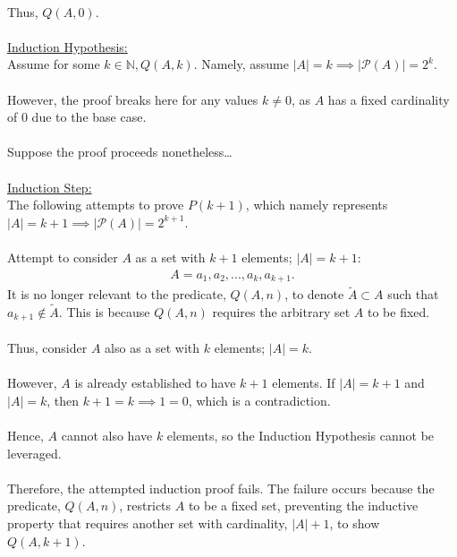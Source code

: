 \documentclass[12pt]{article}
\begin{document}
\\
Thus, $Q(A, 0)$. \\
\\
\underline{Induction Hypothesis:} \\
Assume for some $k \in \mathbb{N}, Q(A, k)$. Namely, assume $|A| = k \implies |\mathcal{P}(A)| = 2^k$. \\
\\
However, the proof breaks here for any values $k \neq 0$, as $A$ has a fixed cardinality of $0$ due to the base case. \\
\\
Suppose the proof proceeds nonetheless\dots\\
\\
\underline{Induction Step:} \\
The following attempts to prove $P(k+1)$, which namely represents $|A| = k + 1 \implies |\mathcal{P}(A)| = 2^{k+1}$. \\
\\
Attempt to consider $A$ as a set with $k + 1$ elements; $|A| = k + 1$: \\
\begin{equation*}
    \begin{aligned}
        A = {a_1, a_2, ..., a_k, a_{k+1}}\text{.}
    \end{aligned}
\end{equation*}
It is no longer relevant to the predicate, $Q(A, n)$, to denote $\widetilde{A} \subset A$ such that $a_{k+1} \notin \widetilde{A}$. This is because $Q(A, n)$ requires the arbitrary set $A$ to be fixed. \\
\\
Thus, consider $A$ also as a set with $k$ elements; $|A| = k$. \\
\\
However, $A$ is already established to have $k + 1$ elements. If $|A| = k + 1$ and $|A| = k$, then $k + 1 = k \implies 1 = 0$, which is a contradiction. \\
\\
Hence, $A$ cannot also have $k$ elements, so the Induction Hypothesis cannot be leveraged. \\
\\
Therefore, the attempted induction proof fails. The failure occurs because the predicate, $Q(A, n)$, restricts $A$ to be a fixed set, preventing the inductive property that requires another set with cardinality, $|A| + 1$, to show $Q(A, k + 1)$.
\end{document}
